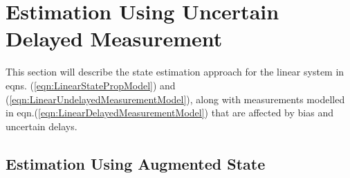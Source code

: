 \section{Estimation Using Uncertain Delayed Measurement} \label{sect:estimation_delayed_msr}
	This section will describe the state estimation approach for the linear system in eqns. (\ref{eqn:LinearStatePropModel}) and (\ref{eqn:LinearUndelayedMeasurementModel}), along with measurements modelled in eqn.(\ref{eqn:LinearDelayedMeasurementModel}) that are affected by bias and uncertain delays.
	
	
	\subsection{Estimation Using Augmented State}
		


%
\clearpage

%

\clearpage




